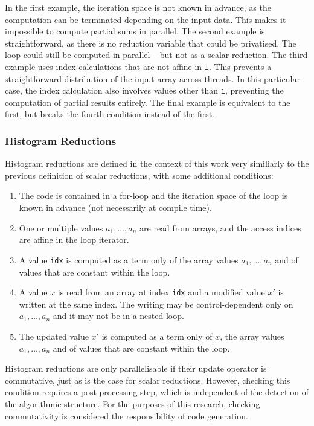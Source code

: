     In the first example, the iteration space is not known in advance, as the
    computation can be terminated depending on the input data.
    This makes it impossible to compute partial sums in parallel.
    The second example is straightforward, as there is no reduction variable
    that could be privatised.
    The loop could still be computed in parallel -- but not as a scalar
    reduction.
    The third example uses index calculations that are not affine in \texttt{i}.
    This prevents a straightforward distribution of the input array across
    threads.
    In this particular case, the index calculation also involves values other
    than \texttt{i}, preventing the computation of partial results entirely.
    The final example is equivalent to the first, but breaks the fourth
    condition instead of the first.

\subsubsection{Histogram Reductions}
\label{section:histocond}

    Histogram reductions are defined in the context of this work very similiarly
    to the previous definition of scalar reductions, with some additional
    conditions:
    \begin{enumerate}
        \item The code is contained in a for-loop and the iteration space of the
              loop is known in advance (not necessarily at compile time).
        \item One or multiple values $a_1,\dots,a_n$ are read from arrays, and
              the access indices are affine in the loop iterator.
        \item A value {\tt idx} is computed as a term only of the array values
              $a_1,\dots,a_n$ and of values that are constant within the loop.
        \item A value $x$ is read from an array at index {\tt idx} and a
              modified value $x'$ is written at the same index.
              The writing may be control-dependent only on $a_1,\dots,a_n$ and
              it may not be in a nested loop.
        \item The updated value $x'$ is computed as a term only of $x$, the
              array values $a_1,\dots,a_n$ and of values that are constant
              within the loop.
    \end{enumerate}

    Histogram reductions are only parallelisable if their update operator is
    commutative, just as is the case for scalar reductions.
    However, checking this condition requires a post-processing step,
    which is independent of the detection of the algorithmic structure.
    For the purposes of this research, checking commutativity is considered the
    responsibility of code generation.

